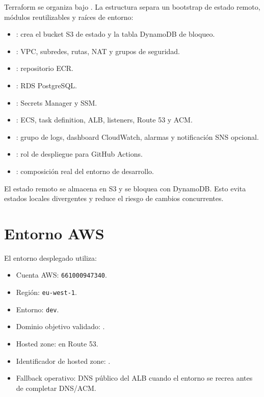 Terraform se organiza bajo . La estructura separa un bootstrap de estado remoto, módulos reutilizables y raíces de entorno:

\begin{itemize}
  \item {}: crea el bucket S3 de estado y la tabla DynamoDB de bloqueo.
  \item {}: VPC, subredes, rutas, NAT y grupos de seguridad.
  \item {}: repositorio ECR.
  \item {}: RDS PostgreSQL.
  \item {}: Secrets Manager y SSM.
  \item {}: ECS, task definition, ALB, listeners, Route 53 y ACM.
  \item {}: grupo de logs, dashboard CloudWatch, alarmas y notificación SNS opcional.
  \item {}: rol de despliegue para GitHub Actions.
  \item {}: composición real del entorno de desarrollo.
\end{itemize}

El estado remoto se almacena en S3 y se bloquea con DynamoDB. Esto evita estados locales divergentes y reduce el riesgo de cambios concurrentes.

\section{Entorno AWS}
\label{sec:entorno-aws}

El entorno desplegado utiliza:

\begin{itemize}
  \item Cuenta AWS: \texttt{661000947340}.
  \item Región: \texttt{eu-west-1}.
  \item Entorno: \texttt{dev}.
  \item Dominio objetivo validado: .
  \item Hosted zone:  en Route 53.
  \item Identificador de hosted zone: .
  \item Fallback operativo: DNS público del ALB cuando el entorno se recrea antes de completar DNS/ACM.
\end{itemize}

